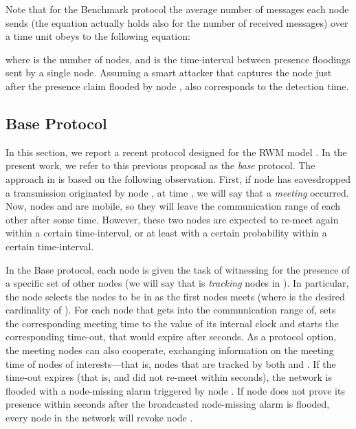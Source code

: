 \documentclass{IEEEconf}
\begin{document}
Note that for the Benchmark protocol the average number of messages  each node sends (the equation actually holds also for the number of received messages) over a time unit  obeys to the following equation:

where  is the number of nodes, and  is the time-interval between presence floodings sent by a single node. Assuming a smart attacker that captures the node  just after the presence claim flooded by node ,  also corresponds to the detection time.




\subsection{Base Protocol}
\label{base}

In this section, we report a recent  protocol  \cite{CDMM:WiSec08:Emergent, CDMM:EURASIP:2009} designed for the RWM model \cite{Broch:RWM:MobiCom98}. In the present work, we refer to this previous proposal as the {\em base} protocol.
The approach in \cite{CDMM:WiSec08:Emergent, CDMM:EURASIP:2009} is based on the following observation. First, if node  has eavesdropped a transmission originated by node , at time , we will say that a {\em meeting} occurred. Now, nodes   and  are mobile, so they will leave the communication range of each other after some time. However, these two nodes are expected to re-meet again within a certain time-interval, or at least with a certain probability within a certain time-interval.


In the Base protocol, each node  is given the task of witnessing for the presence of a specific set  of other nodes (we will say that  is  \emph{tracking} nodes in ). In particular, the node  selects the nodes to be in  as the first  nodes  meets (where  is the desired cardinality of ).
For each node  that  gets into the communication range of,  sets the corresponding meeting time to the value of its internal clock and starts the corresponding time-out, that would expire
after  seconds. As a protocol option, the meeting nodes can also cooperate, exchanging information on the meeting time of nodes of interests---that is, nodes that are tracked by both  and .
If the time-out expires (that is,  and  did not re-meet within  seconds), the network is flooded with a node-missing alarm triggered by node . If node  does not prove its presence within   seconds after the broadcasted node-missing alarm is flooded, every node in the network will revoke node .
\end{document}
